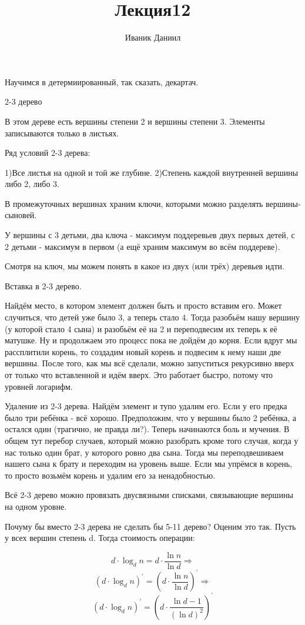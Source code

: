 \documentclass{article}
\author{Иваник Даниил}
\title{Лекция12}
\begin{document}
Научимся в детермиированный, так сказать, декартач.

2-3 дерево

В этом дереве есть вершины степени 2 и вершины степени 3. Элементы записываются только в листьях.

Ряд условий 2-3 дерева:

1)Все листья на одной и той же глубине.
2)Степень каждой внутренней вершины либо 2, либо 3.

В промежуточных вершинах храним ключи, которыми можно разделять вершины-сыновей.

У вершины с 3 детьми, два ключа - максимум поддеревьев двух первых детей, с 2 детьми - максимум в первом (а ещё храним максимум во всём поддереве).

Смотря на ключ, мы можем понять в какое из двух (или трёх) деревьев идти. 

Вставка в 2-3 дерево.

Найдём место, в котором элемент должен быть и просто вставим его. Может случиться, что детей уже было 3, а теперь стало 4. Тогда разобьём нашу вершину (у которой стало 4 сына) и разобьём её на 2 и переподвесим их теперь к её матушке. Ну и продолжаем это процесс пока не дойдём до корня. Если вдруг мы рассплитили корень, то создадим новый корень и подвесим к нему наши две вершины. После того, как мы всё сделали, можно запуститься рекурсивно вверх от только что вставленной и идём вверх. Это работает быстро, потому что уровней логарифм.

Удаление из 2-3 дерева.
Найдём элемент и тупо удалим его. Если у его предка было три ребёнка - всё хорошо. Предположим, что у вершины было 2 ребёнка, а остался один (трагично, не правда ли?). Теперь начинаются боль и мучения. В общем тут перебор случаев, который можно разобрать кроме того случая, когда у нас только один брат, у которого ровно два сына.  Тогда мы переподвешиваем нашего сына к брату и переходим на уровень выше. Если мы упрёмся в корень, то просто возьмём корень и удалим его за ненадобностью.

Всё 2-3 дерево можно провязать двусвязными списками, связывающие вершины на одном уровне.

Почуму бы вместо 2-3 дерева не сделать бы 5-11 дерево? Оценим это так. Пусть у всех вершин степень d. Тогда стоимость операции:

\[d \cdot \log_d{n} = d \cdot \frac{\ln{n}}{\ln{d}} \Rightarrow\]
\[(d \cdot \log_d{n})^{'} = (d \cdot \frac{\ln{n}}{\ln{d}})^{'} \Rightarrow\]
\[(d \cdot \log_d{n})^{'} = (d \cdot \frac{\ln{d} - 1}{(\ln{d})^2})^{'}\]
\end{document}

